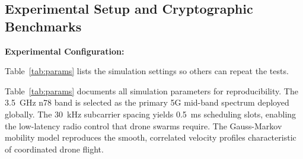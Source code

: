 \documentclass{ieeeaccess}
\begin{document}
\subsection{Experimental Setup and Cryptographic Benchmarks}
\noindent\textbf{Experimental Configuration:}

Table~\ref{tab:params} lists the simulation settings so others can repeat the tests.

\begin{table}[ht]
\caption{Experimental Configuration Parameters for the NS-3 5G-LENA Simulation}
\label{tab:params}
\begin{center}
\end{center}
\end{table}

Table~\ref{tab:params} documents all simulation parameters for reproducibility. The 3.5~GHz n78 band is selected as the primary 5G mid-band spectrum deployed globally. The 30~kHz subcarrier spacing yields 0.5~ms scheduling slots, enabling the low-latency radio control that drone swarms require. The Gauss-Markov mobility model reproduces the smooth, correlated velocity profiles characteristic of coordinated drone flight.
\end{document}
